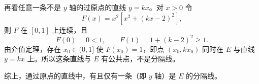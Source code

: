 \begin{answer}
再看任意一条不是 $y$ 轴的过原点的直线 $y=kx$。对 $x>0$ 令
\nopagebreak[4]
\[F(x)=x^2\left[x^2+(kx-2)^2\right],\]
则 $F$ 在 $[0,1]$ 上连续，且
\nopagebreak[4]
\[F(0)=0<1,\qquad F(1)=1+(k-2)^2\geqslant1 .\]
由介值定理，存在 $x_0\in(0,1]$ 使 $F(x_0)=1$，即点 $(x_0,kx_0)$ 同时在 $E$ 与直线 $y=kx$ 上。所以这条直线与 $E$ 有公共点，不是分隔线。

综上，通过原点的直线中，有且仅有一条（即 $y$ 轴）是 $E$ 的分隔线。


\gkanswer{答案（2）：$k\in\left(-\infty,-\dfrac12\right]\cup\left[\dfrac12,+\infty\right)$。$|k|<\dfrac12$ 时直线与双曲线相交；$|k|\geqslant\dfrac12$ 时无公共点，且取关于 $y$ 轴对称的两点可使 $\eta=u^2-k^2t^2<0$。}


\end{answer}
